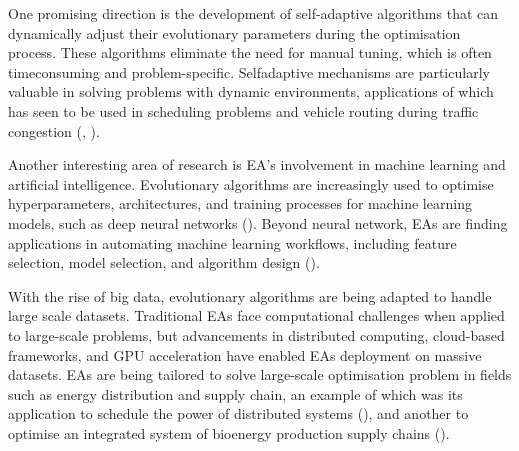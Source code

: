 \noindent One promising direction is the development of self-adaptive algorithms that can dynamically adjust their evolutionary parameters during the optimisation process. These algorithms eliminate the need for manual tuning, which is often time\-consuming and problem-specific. Self\-adaptive mechanisms are particularly valuable in solving problems with dynamic environments, applications of which has seen to be used in scheduling problems and vehicle routing during traffic congestion (\cite{dulebenets2018self}, \cite{sabar2019self}). \bigskip

\noindent Another interesting area of research is EA's involvement in machine learning and artificial intelligence. Evolutionary algorithms are increasingly used to optimise hyperparameters, architectures, and training processes for machine learning models, such as deep neural networks (\cite{young2015optimizing}). Beyond neural network, EAs are finding applications in automating machine learning workflows, including feature selection, model selection, and algorithm design (\cite{nikitin2022automated}). \bigskip

\noindent With the rise of big data, evolutionary algorithms are being adapted to handle large scale datasets. Traditional EAs face computational challenges when applied to large-scale problems, but advancements in distributed computing, cloud-based frameworks, and GPU acceleration have enabled EAs deployment on massive datasets. EAs are being tailored to solve large-scale optimisation problem in fields such as energy distribution and supply chain, an example of which was its application to schedule the power of distributed systems (\cite{guzek2014multi}), and another to optimise an integrated system of bioenergy production supply chains (\cite{ayoub2009evolutionary}).

